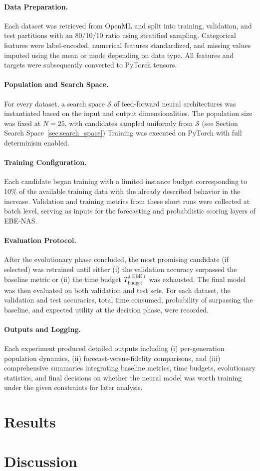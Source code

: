 \documentclass[stu,12pt,floatsintext,doublespacing]{apa7}
\begin{document}
\paragraph{Data Preparation.}
Each dataset was retrieved from OpenML and split into training, validation, and test partitions with an 80/10/10 ratio using stratified sampling. Categorical features were label-encoded, numerical features standardized, and missing values imputed using the mean or mode depending on data type. All features and targets were subsequently converted to PyTorch tensors.

\paragraph{Population and Search Space.}
For every dataset, a search space $\mathcal{S}$ of feed-forward neural architectures was instantiated based on the input and output dimensionalities. The population size was fixed at $N=25$, with candidates sampled uniformly from $\mathcal{S}$ (see Section Search Space~\ref{sec:search_space}) Training was executed on PyTorch with full determinism enabled.

\paragraph{Training Configuration.}
Each candidate began training with a limited instance budget corresponding to 10\% of the available training data with the already described behavior in the increase. Validation and training metrics from these short runs were collected at batch level, serving as inputs for the forecasting and probabilistic scoring layers of EBE-NAS. 

\paragraph{Evaluation Protocol.}
After the evolutionary phase concluded, the most promising candidate (if selected) was retrained until either (i) the validation accuracy surpassed the baseline metric or (ii) the time budget $T_{\mathrm{budget}}^{(\mathrm{EBE})}$ was exhausted. The final model was then evaluated on both validation and test sets. For each dataset, the validation and test accuracies, total time consumed, probability of surpassing the baseline, and expected utility at the decision phase, were recorded.

\paragraph{Outputs and Logging.}
Each experiment produced detailed outputs including (i) per-generation population dynamics, (ii) forecast-versus-fidelity comparisons, and (iii) comprehensive summaries integrating baseline metrics, time budgets, evolutionary statistics, and final decisions on whether the neural model was worth training under the given constraints for later analysis.


\section{Results}

\section{Discussion}

\renewcommand\refname{\large\textbf{Referencias}}
\printbibliography

\newpage
\end{document}
